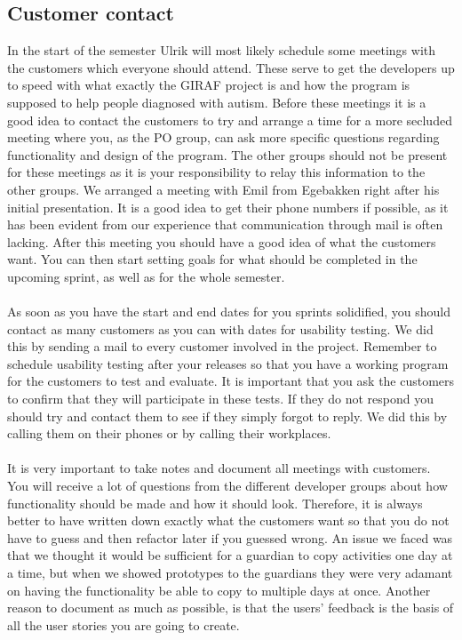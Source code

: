 \subsection{Customer contact}
In the start of the semester Ulrik will most likely schedule some meetings with the customers which everyone should attend.
These serve to get the developers up to speed with what exactly the GIRAF project is and how the program is supposed to help people diagnosed with autism.
Before these meetings it is a good idea to contact the customers to try and arrange a time for a more secluded meeting where you, as the PO group, can ask more specific questions regarding functionality and design of the program.
The other groups should not be present for these meetings as it is your responsibility to relay this information to the other groups.
We arranged a meeting with Emil from Egebakken right after his initial presentation.
It is a good idea to get their phone numbers if possible, as it has been evident from our experience that communication through mail is often lacking.
After this meeting you should have a good idea of what the customers want.
You can then start setting goals for what should be completed in the upcoming sprint, as well as for the whole semester.
\\\\
As soon as you have the start and end dates for you sprints solidified, you should contact as many customers as you can with dates for usability testing. 
We did this by sending a mail to every customer involved in the project.
Remember to schedule usability testing after your releases so that you have a working program for the customers to test and evaluate.
It is important that you ask the customers to confirm that they will participate in these tests.
If they do not respond you should try and contact them to see if they simply forgot to reply.
We did this by calling them on their phones or by calling their workplaces.
\\\\
It is very important to take notes and document all meetings with customers.
You will receive a lot of questions from the different developer groups about how functionality should be made and how it should look.
Therefore, it is always better to have written down exactly what the customers want so that you do not have to guess and then refactor later if you guessed wrong.
An issue we faced was that we thought it would be sufficient for a guardian to copy activities one day at a time, but when we showed prototypes to the guardians they were very adamant on having the functionality be able to copy to multiple days at once.
Another reason to document as much as possible, is that the users' feedback is the basis of all the user stories you are going to create.

